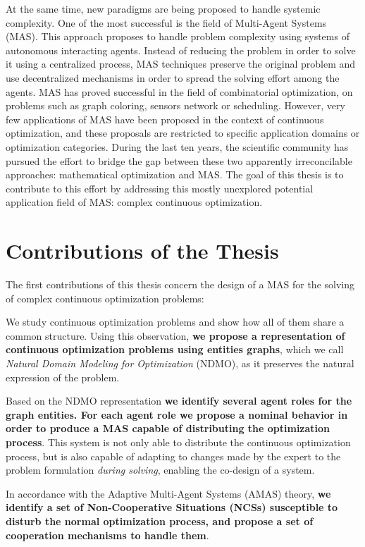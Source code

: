 At the same time, new paradigms are being proposed to handle systemic complexity. One of the most successful is the field of Multi-Agent Systems (MAS). This approach proposes to handle problem complexity using systems of autonomous interacting agents. Instead of reducing the problem in order to solve it using a centralized process, MAS techniques preserve the original problem and use decentralized mechanisms in order to spread the solving effort among the agents. MAS has proved successful in the field of combinatorial optimization, on problems such as graph coloring, sensors network or scheduling. However, very few applications of MAS have been proposed in the context of continuous optimization, and these proposals are restricted to specific application domains or optimization categories.
\newpage
During the last ten years, the scientific community has pursued the effort to bridge the gap between these two apparently irreconcilable approaches: mathematical optimization and MAS. The goal of this thesis is to contribute to this effort by addressing this mostly unexplored potential application field of MAS: complex continuous optimization.

\section*{Contributions of the Thesis}

The first contributions of this thesis concern the design of a MAS for the solving of complex continuous optimization problems:

We study continuous optimization problems and show how all of them share a common structure. Using this observation, \textbf{we propose a representation of continuous optimization problems using entities graphs}, which we call \emph{Natural Domain Modeling for Optimization} (NDMO), as it preserves the natural expression of the problem.

Based on the NDMO representation \textbf{we identify several agent roles for the graph entities. For each agent role we propose a nominal behavior in order to produce a MAS capable of distributing the optimization process}. This system is not only able to distribute the continuous optimization process, but is also capable of adapting to changes made by the expert to the problem formulation \emph{during solving}, enabling the co-design of a system.

In accordance with the Adaptive Multi-Agent Systems (AMAS) theory, \textbf{we identify a set of Non-Cooperative Situations (NCSs) susceptible to disturb the normal optimization process, and propose a set of cooperation mechanisms to handle them}.

